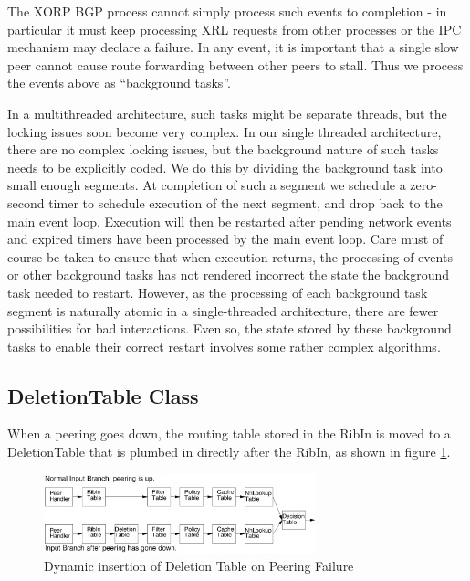 \documentclass[11pt]{article}
\begin{document}
The XORP BGP process cannot simply process such events to completion -
in particular it must keep processing XRL requests from other
processes or the IPC mechanism may declare a failure.  In any event,
it is important that a single slow peer cannot cause route forwarding
between other peers to stall.  Thus we process the events above as
``background tasks''.  

In a multithreaded architecture, such tasks might be separate threads,
but the locking issues soon become very complex.  In our single
threaded architecture, there are no complex locking issues, but the
background nature of such tasks needs to be explicitly coded.  We do
this by dividing the background task into small enough segments.  At
completion of such a segment we schedule a zero-second timer to
schedule execution of the next segment, and drop back to the main
event loop.  Execution will then be restarted after pending network
events and expired timers have been processed by the main event loop.
Care must of course be taken to ensure that when execution returns,
the processing of events or other background tasks has not rendered
incorrect the state the background task needed to restart.  However,
as the processing of each background task segment is naturally atomic
in a single-threaded architecture, there are fewer possibilities for
bad interactions.  Even so, the state stored by these background tasks
to enable their correct restart involves some rather complex
algorithms.

\subsection{DeletionTable Class}

When a peering goes down, the routing table stored in the RibIn is
moved to a DeletionTable that is plumbed in directly after the RibIn,
as shown in figure \ref{del_table}.

\begin{figure}[htb]
\centerline{\includegraphics[width=0.7\textwidth]{figs/del_table}}
\vspace{.05in}
\caption{\label{del_table}Dynamic insertion of Deletion Table on
Peering Failure}
\end{figure}
\end{document}
